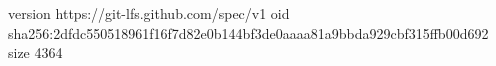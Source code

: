 version https://git-lfs.github.com/spec/v1
oid sha256:2dfdc550518961f16f7d82e0b144bf3de0aaaa81a9bbda929cbf315ffb00d692
size 4364
